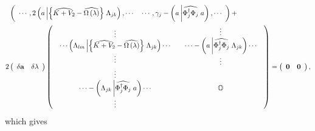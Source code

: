 \documentclass[aps,preprint]{revtex4}%
\begin{document}
\begin{align}
&  \left(
\begin{array}
[c]{cc}%
\cdots,2\left(  a\left\vert \left\{  \widehat{K+V_{2}}-\widehat{\Omega\left(
\lambda\right)  }\right\}  \right.  \Lambda_{jk}\right)  ,\cdots &
\cdots,\gamma_{j}-\left(  a\left\vert \widehat{\Phi_{j}^{\dagger}\Phi_{j}%
}\right.  a\right)  ,\cdots
\end{array}
\right)  +\nonumber\\
2  &  \left(
\begin{array}
[c]{cc}%
\delta\mathbf{a} & \delta\mathbf{\lambda}%
\end{array}
\right)  \left(
\begin{array}
[c]{cc}%
\begin{array}
[c]{c}%
\vdots\\
\cdots\left(  \Lambda_{lm}\left\vert \left\{  \widehat{K+V_{2}}-\widehat
{\Omega\left(  \lambda\right)  }\right\}  \right.  \Lambda_{jk}\right)
\cdots\\
\vdots
\end{array}
&
\begin{array}
[c]{c}%
\vdots\\
\cdots-\left(  a\left\vert \widehat{\Phi_{j}^{\dagger}\Phi_{j}}\right.
\Lambda_{jk}\right)  \cdots\\
\vdots
\end{array}
\\%
\begin{array}
[c]{c}%
\vdots\\
\cdots-\left(  \Lambda_{jk}\left\vert \widehat{\Phi_{j}^{\dagger}\Phi_{j}%
}\right.  a\right)  \cdots\\
\vdots
\end{array}
& \mathbb{O}%
\end{array}
\right)  =\left(
\begin{array}
[c]{cc}%
\mathbf{0} & \mathbf{0}%
\end{array}
\right)  \mathbf{,}%
\end{align}
which gives%
\end{document}

